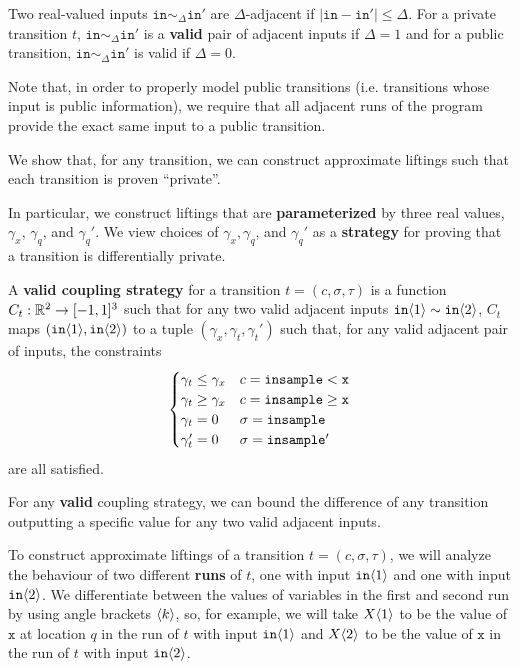 \begin{defn}
    Two real-valued inputs $\texttt{in}\sim_{\Delta} \texttt{in}'$ are $\Delta$-adjacent if $|\texttt{in}-\texttt{in}'|\leq \Delta$. For a private transition $t$, $\texttt{in}\sim_{\Delta}\texttt{in}'$ is a \textbf{valid} pair of adjacent inputs if $\Delta = 1$ and for a public transition, $\texttt{in}\sim_{\Delta}\texttt{in}'$ is valid if $\Delta = 0$.
\end{defn}

Note that, in order to properly model public transitions (i.e. transitions whose input is public information), we require that all adjacent runs of the program provide the exact same input to a public transition. 

We show that, for any transition, we can construct approximate liftings such that each transition is proven ``private''. 

In particular, we construct liftings that are \textbf{parameterized} by three real values, $\gamma_x$, $\gamma_q$, and $\gamma_q'$. We view choices of $\gamma_x, \gamma_q$, and $\gamma_q'$ as a \textbf{strategy} for proving that a transition is differentially private.

\begin{defn}
    A \textbf{valid coupling strategy} for a transition $t = (c, \sigma, \tau)$ is a function $C_t:\RR^2\to[-1, 1]^3$ such that for any two valid adjacent inputs $\texttt{in}\brangle{1}\sim\texttt{in}\brangle{2}$, $C_t$ maps $(\texttt{in}\brangle{1},\texttt{in}\brangle{2})$ to a tuple $(\gamma_x, \gamma_t, \gamma_t')$ such that, for any valid adjacent pair of inputs, the constraints \[
        \begin{cases}
          \gamma_t\leq\gamma_x & c = \lguard[\texttt{x}]\\
          \gamma_t\geq\gamma_x & c = \gguard[\texttt{x}]\\
          \gamma_t=0 & \sigma = \texttt{insample}\\
          \gamma_t'=0 & \sigma = \texttt{insample}'
        \end{cases}
      \]
      are all satisfied. 
\end{defn}

For any \textbf{valid} coupling strategy, we can bound the difference of any transition outputting a specific value for any two valid adjacent inputs. 

To construct approximate liftings of a transition $t = (c, \sigma, \tau)$, we will analyze the behaviour of two different \textbf{runs} of $t$, one with input $\texttt{in}\brangle{1}$ and one with input $\texttt{in}\brangle{2}$. 
We differentiate between the values of variables in the first and second run by using angle brackets $\brangle{k}$, so, for example, we will take $X\brangle{1}$ to be the value of $\texttt{x}$ at location $q$ in the run of $t$ with input $\texttt{in}\brangle{1}$ and $X\brangle{2}$ to be the value of $\texttt{x}$ in the run of $t$ with input $\texttt{in}\brangle{2}$. 

